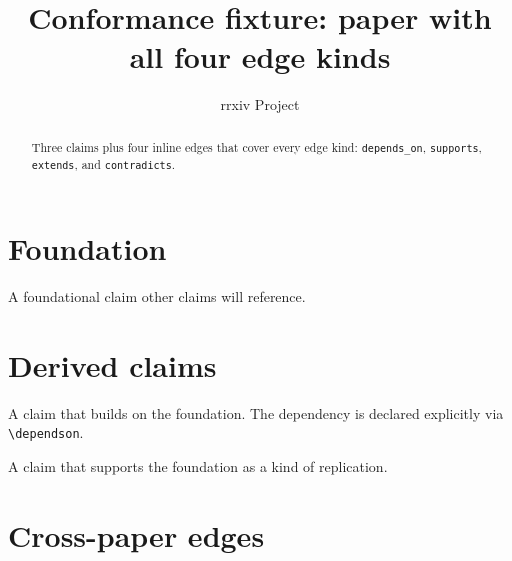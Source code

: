 \documentclass{rrxiv}
\title{Conformance fixture: paper with all four edge kinds}
\author{rrxiv Project}
\begin{document}
\maketitle

\begin{abstract}
Three claims plus four inline edges that cover every edge kind:
\texttt{depends\_on}, \texttt{supports}, \texttt{extends}, and
\texttt{contradicts}.
\end{abstract}

\section{Foundation}

\begin{claim}
\label{claim:foundation}
A foundational claim other claims will reference.
\end{claim}

\section{Derived claims}

\begin{claim}
\label{claim:derived}
A claim that builds on the foundation. The dependency is declared
explicitly via \texttt{\textbackslash dependson}.
\end{claim}


\begin{claim}
\label{claim:replication}
A claim that supports the foundation as a kind of replication.
\end{claim}


\section{Cross-paper edges}


\end{document}
